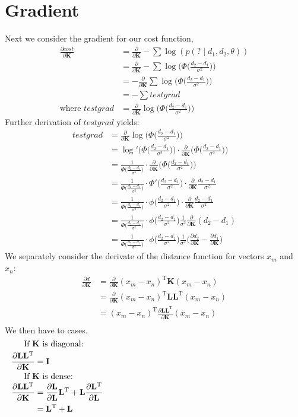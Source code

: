 \documentclass[12pt]{article}
\newcommand\K{\mathbf{K}}
\newcommand\T{\text{T}}
\newcommand\EL{\mathbf{L}}
\begin{document}
\section{Gradient}
Next we consider the gradient for our cost function, 
\begin{align*}
\frac{\partial cost}{\partial \K}
&= \frac{\partial}{\partial \K} -\sum\log(p(? \mid d_1, d_2, \theta))\\
&= \frac{\partial}{\partial \K} -\sum\log\Big(\Phi\Big(\frac{d_2-d_1}{\sigma^2}\Big)\Big)\\
&= -\frac{\partial}{\partial \K} \sum\log\Big(\Phi\Big(\frac{d_2-d_1}{\sigma^2}\Big)\Big)\\
&= -\sum testgrad\\
\text{where } testgrad &= \frac{\partial}{\partial \K}\log\Big(\Phi\Big(\frac{d_2-d_1}{\sigma^2}\Big)\Big)
\end{align*}
Further derivation of $testgrad$ yields:
\begin{align*}
testgrad
&= \frac{\partial}{\partial \K}\log\Big(\Phi\Big(\frac{d_2-d_1}{\sigma^2}\Big)\Big)\\
&= \log'\Big(\Phi\Big(\frac{d_2-d_1}{\sigma^2}\Big)\Big)\cdot \frac{\partial}{\partial \K}\Big(\Phi\Big(\frac{d_2-d_1}{\sigma^2}\Big)\Big)\\
&= \frac{1}{\Phi\Big(\frac{d_2-d_1}{\sigma^2}\Big)}\cdot \frac{\partial}{\partial \K}\Big(\Phi\Big(\frac{d_2-d_1}{\sigma^2}\Big)\Big)\\
&= \frac{1}{\Phi\Big(\frac{d_2-d_1}{\sigma^2}\Big)}\cdot \Phi'\Big(\frac{d_2-d_1}{\sigma^2}\Big)\cdot\frac{\partial}{\partial \K}\frac{d_2-d_1}{\sigma^2}\\
&= \frac{1}{\Phi\Big(\frac{d_2-d_1}{\sigma^2}\Big)}\cdot \phi\Big(\frac{d_2-d_1}{\sigma^2}\Big)\cdot\frac{\partial}{\partial \K}\frac{d_2-d_1}{\sigma^2}\\
&= \frac{1}{\Phi\Big(\frac{d_2-d_1}{\sigma^2}\Big)}\cdot \phi\Big(\frac{d_2-d_1}{\sigma^2}\Big)\frac{1}{{\sigma^2}}\frac{\partial}{\partial \K}(d_2-d_1)\\
&= \frac{1}{\Phi\Big(\frac{d_2-d_1}{\sigma^2}\Big)}\cdot \phi\Big(\frac{d_2-d_1}{\sigma^2}\Big)\frac{1}{{\sigma^2}}\Bigg(\frac{\partial d_2}{\partial \K}-\frac{\partial d_1}{\partial \K}\Bigg)
\end{align*}
We separately consider the derivate of the distance function for vectors $x_m$ and $x_n$:
\begin{align*}
\frac{\partial d}{\partial \K}
&= \frac{\partial}{\partial \K} (x_m-x_n)^\T \K (x_m-x_n)\\
&= \frac{\partial}{\partial \K} (x_m-x_n)^\T \EL\EL^\T (x_m-x_n)\\
&=  (x_m-x_n)^\T \frac{\partial \EL\EL^\T}{\partial \K}(x_m-x_n)\\
\end{align*}
We then have to cases.
\begin{align*}
\noalign{If $\K$ is diagonal:}
\frac{\partial \EL\EL^\T}{\partial \K}
&= \mathbf{I}\\
\noalign{If $\K$ is dense:}
\frac{\partial \EL\EL^\T}{\partial \K}
&= \frac{\partial \EL}{\partial \EL}\EL^\T+\EL\frac{\partial \EL^\T}{\partial \EL}\\
&= \EL^\T+\EL
\end{align*}
\end{document}
